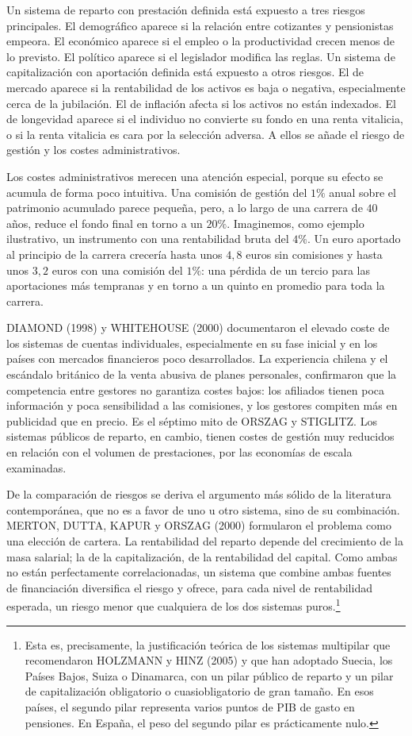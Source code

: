 \documentclass[10pt,a4paper]{article}
\begin{document}
Un sistema de reparto con prestación definida está expuesto a tres riesgos principales. El demográfico aparece si la relación entre cotizantes y pensionistas empeora. El económico aparece si el empleo o la productividad crecen menos de lo previsto. El político aparece si el legislador modifica las reglas. Un sistema de capitalización con aportación definida está expuesto a otros riesgos. El de mercado aparece si la rentabilidad de los activos es baja o negativa, especialmente cerca de la jubilación. El de inflación afecta si los activos no están indexados. El de longevidad aparece si el individuo no convierte su fondo en una renta vitalicia, o si la renta vitalicia es cara por la selección adversa. A ellos se añade el riesgo de gestión y los costes administrativos.

Los costes administrativos merecen una atención especial, porque su efecto se acumula de forma poco intuitiva. Una comisión de gestión del $1\%$ anual sobre el patrimonio acumulado parece pequeña, pero, a lo largo de una carrera de $40$ años, reduce el fondo final en torno a un $20\%$. Imaginemos, como ejemplo ilustrativo, un instrumento con una rentabilidad bruta del $4\%$. Un euro aportado al principio de la carrera crecería hasta unos $4,8$ euros sin comisiones y hasta unos $3,2$ euros con una comisión del $1\%$: una pérdida de un tercio para las aportaciones más tempranas y en torno a un quinto en promedio para toda la carrera. 

DIAMOND (1998) y WHITEHOUSE (2000) documentaron el elevado coste de los sistemas de cuentas individuales, especialmente en su fase inicial y en los países con mercados financieros poco desarrollados. La experiencia chilena y el escándalo británico de la venta abusiva de planes personales, confirmaron que la competencia entre gestores no garantiza costes bajos: los afiliados tienen poca información y poca sensibilidad a las comisiones, y los gestores compiten más en publicidad que en precio. Es el séptimo mito de ORSZAG y STIGLITZ. Los sistemas públicos de reparto, en cambio, tienen costes de gestión muy reducidos en relación con el volumen de prestaciones, por las economías de escala examinadas.

De la comparación de riesgos se deriva el argumento más sólido de la literatura contemporánea, que no es a favor de uno u otro sistema, sino de su combinación. MERTON, DUTTA, KAPUR y ORSZAG (2000) formularon el problema como una elección de cartera. La rentabilidad del reparto depende del crecimiento de la masa salarial; la de la capitalización, de la rentabilidad del capital. Como ambas no están perfectamente correlacionadas, un sistema que combine ambas fuentes de financiación diversifica el riesgo y ofrece, para cada nivel de rentabilidad esperada, un riesgo menor que cualquiera de los dos sistemas puros.\footnote{%
    Esta es, precisamente, la justificación teórica de los sistemas multipilar que recomendaron HOLZMANN y HINZ (2005) y que han adoptado Suecia, los Países Bajos, Suiza o Dinamarca, con un pilar público de reparto y un pilar de capitalización obligatorio o cuasiobligatorio de gran tamaño. En esos países, el segundo pilar representa varios puntos de PIB de gasto en pensiones. En España, el peso del segundo pilar es prácticamente nulo.
}
\end{document}
